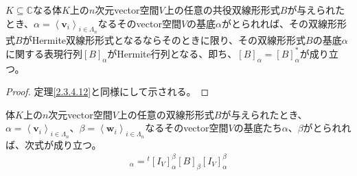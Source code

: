 \documentclass[dvipdfmx]{jsarticle}
\begin{document}
\begin{thm}\label{2.3.4.13}
$K \subseteq \mathbb{C}$なる体$K$上の$n$次元vector空間$V$上の任意の共役双線形形式$B$が与えられたとき、$\alpha = \left\langle \mathbf{v}_{i} \right\rangle_{i \in \varLambda_{n}}$なるそのvector空間$V$の基底$\alpha$がとられれば、その双線形形式$B$がHermite双線形形式となるならそのときに限り、その双線形形式$B$の基底$\alpha$に関する表現行列$[ B]_{\alpha}$がHermite行列となる、即ち、$[ B]_{\alpha} = [ B]_{\alpha}^{*}$が成り立つ。
\end{thm}
\begin{proof} 定理\ref{2.3.4.12}と同様にして示される。
\end{proof}
\begin{thm}\label{2.3.4.14}
体$K$上の$n$次元vector空間$V$上の任意の双線形形式$B$が与えられたとき、$\alpha = \left\langle \mathbf{v}_{i} \right\rangle_{i \in \varLambda_{n}}$、$\beta = \left\langle \mathbf{w}_{i} \right\rangle_{i \in \varLambda_{n}}$なるそのvector空間$V$の基底たち$\alpha$、$\beta$がとられれば、次式が成り立つ。
\begin{align*}
[ B]_{\alpha} ={}^{t}\left[ I_{V} \right]^{\beta}_{\alpha}[ B]_{\beta}\left[ I_{V} \right]^{\beta}_{\alpha}
\end{align*}
\end{thm}
\end{document}

